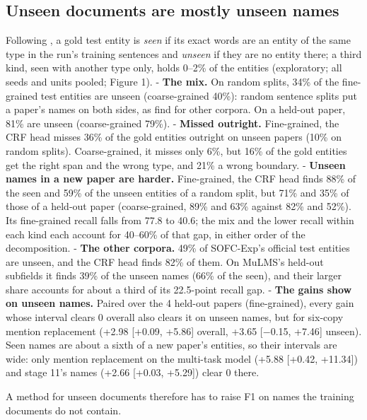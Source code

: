 \documentclass[11pt,a4paper]{article}
\begin{document}
\hypertarget{unseen-documents-are-mostly-unseen-names}{%
\subsection{Unseen documents are mostly unseen names}\label{unseen-documents-are-mostly-unseen-names}}

Following \citet{augenstein2017generalisation}, a gold test entity is \emph{seen} if
its exact words are an entity of the same type in the run's training
sentences and \emph{unseen} if they are no entity there; a third kind, seen
with another type only, holds 0--2\% of the entities (exploratory; all seeds
and units pooled; Figure 1).
- \textbf{The mix.} On random splits, 34\% of the fine-grained test entities are
unseen (coarse-grained 40\%): random sentence splits put a paper's names
on both sides, as \citet{babl2025random} find for other corpora. On a held-out
paper, 81\% are unseen (coarse-grained 79\%).
- \textbf{Missed outright.} Fine-grained, the CRF head misses 36\% of the gold
entities outright on unseen papers (10\% on random splits).
Coarse-grained, it misses only 6\%, but 16\% of the gold entities get the
right span and the wrong type, and 21\% a wrong boundary.
- \textbf{Unseen names in a new paper are harder.} Fine-grained, the CRF head
finds 88\% of the seen and 59\% of the unseen entities of a random split,
but 71\% and 35\% of those of a held-out paper (coarse-grained, 89\% and
63\% against 82\% and 52\%). Its fine-grained recall falls from 77.8 to
40.6; the mix and the lower recall within each kind each account for
40--60\% of that gap, in either order of the decomposition.
- \textbf{The other corpora.} 49\% of SOFC-Exp's official test entities are
unseen, and the CRF head finds 82\% of them. On MuLMS's held-out
subfields it finds 39\% of the unseen names (66\% of the seen), and their
larger share accounts for about a third of its 22.5-point recall gap.
- \textbf{The gains show on unseen names.} Paired over the 4 held-out papers
(fine-grained), every gain whose interval clears 0 overall also clears
it on unseen names, but for six-copy mention replacement (+2.98 {[}+0.09,
+5.86{]} overall, +3.65 {[}−0.15, +7.46{]} unseen). Seen names are about a
sixth of a new paper's entities, so their intervals are wide: only mention
replacement on the multi-task model (+5.88 {[}+0.42, +11.34{]}) and stage
11's names (+2.66 {[}+0.03, +5.29{]}) clear 0 there.

A method for unseen documents therefore has to raise F1 on names the
training documents do not contain.
\end{document}
